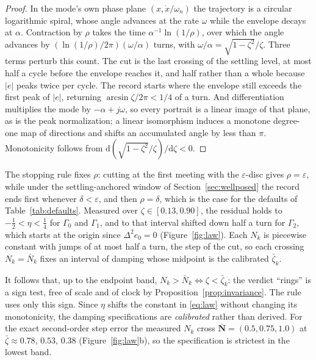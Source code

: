 \documentclass[final,3p,times,twocolumn]{elsarticle}
\newcommand{\rev}[1]{#1}   %
\begin{document}
\begin{proof}
In the mode's own phase plane $(x, \dot x/\omega_n)$ the trajectory is a
circular logarithmic spiral, whose angle advances at the rate $\omega$
while the envelope decays at $\alpha$. Contraction by $\rho$ takes the
time $\alpha^{-1}\ln(1/\rho)$, over which the angle advances by
$(\ln(1/\rho)/2\pi)(\omega/\alpha)$ turns, with
$\omega/\alpha = \sqrt{1-\zeta^2}/\zeta$. Three terms perturb this count. The cut is the last crossing of the
settling level, at most half a cycle before the envelope reaches it, and
half rather than a whole because $|e|$ peaks twice per cycle. The record
starts where the envelope still exceeds the first peak of $|e|$,
returning $\arcsin\zeta/2\pi<1/4$ of a turn. And differentiation
multiplies the mode by $-\alpha+j\omega$, so every portrait is a linear
image of that plane, as is the peak normalization; a linear isomorphism
induces a monotone degree-one map of directions and shifts an accumulated
angle by less than $\pi$. Monotonicity follows from
$\mathrm d(\sqrt{1-\zeta^2}/\zeta)/\mathrm d\zeta<0$.
\end{proof}

\rev{The stopping rule fixes $\rho$: cutting at the first meeting with
the $\varepsilon$-disc gives $\rho = \varepsilon$, while under the
settling-anchored window of Section~\ref{sec:wellposed} the record ends
first whenever $\delta < \varepsilon$, and then $\rho = \delta$, which is
the case for the defaults of Table~\ref{tab:defaults}. Measured over $\zeta \in [0.13, 0.90]$, the residual
holds to $-\tfrac12 < \eta < \tfrac14$ for $\Gamma_0$ and $\Gamma_1$, and
to that interval shifted down half a turn for $\Gamma_2$, which starts at
the origin since $\Delta^2 e_0 = 0$ (Figure~\ref{fig:law}). Each $N_k$ is
piecewise constant with jumps of at most half a turn, the step of the
cut, so each crossing $N_k = \bar N_k$ fixes an interval of damping whose
midpoint is the calibrated $\bar\zeta_k$.}

It follows that\rev{, up to the endpoint band,}
$N_k>\bar N_k \iff \zeta<\bar\zeta_k$: the verdict ``rings'' is a sign
test, free of scale and of clock by
Proposition~\ref{prop:invariance}. The rule uses only this sign. Since $\eta$ shifts the constant in
\eqref{eq:law} without changing its monotonicity, the damping
specifications are \emph{calibrated} rather than derived. For the exact second-order step error the measured $N_k$ cross
$\bar{\mathbf N}=(0.5,0.75,1.0)$ at
$\bar\zeta \approx 0.78,\,0.53,\,0.38$ (Figure~\ref{fig:law}b), so the
specification is strictest in the lowest band.
\end{document}
